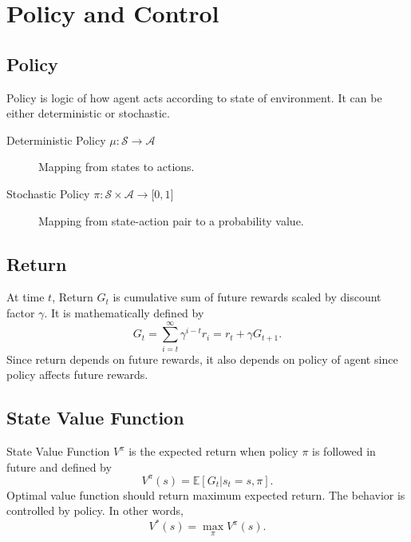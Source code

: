 \section{Policy and Control}
\label{sec:policy_control}

\subsection{Policy}

Policy is logic of how agent acts according to state of environment. 
It can be either deterministic or stochastic. 

\begin{description}
	\item[Deterministic Policy $\mu \colon \mathcal{S} \rightarrow \mathcal{A}$] 
	Mapping from states to actions.
	\item[Stochastic Policy $\pi \colon \mathcal{S} \times \mathcal{A} \rightarrow \lbrack 0,1 \rbrack$] 
	Mapping from state-action pair to a probability value.
\end{description}

\subsection{Return}

At time $t$, Return $G_t$ is cumulative sum of future rewards scaled by discount factor $\gamma$. 
It is mathematically defined by 
\begin{equation}
\label{eqn:return_dfn}
G_t = \sum_{i=t}^{\infty} \gamma^{i-t} r_i = r_t + \gamma G_{t+1}.
\end{equation}
Since return depends on future rewards, it also depends on policy of agent since policy affects future rewards.

\subsection{State Value Function}

State Value Function $V^{\pi}$ is the expected return when policy $\pi$ is followed in future and defined by
\begin{equation}
V^{\pi}(s) = \mathbb{E}[G_t|s_t=s, \pi]. %
\end{equation}
Optimal value function should return maximum expected return. 
The behavior is controlled by policy. In other words, 
\begin{equation}
V^{*}(s) = \max_{\pi} V^{\pi}(s).
\end{equation}

